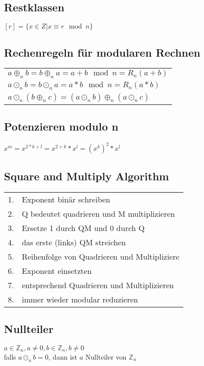 \subsection{Restklassen}
$ [r] = \{x \in Z | x \equiv r \mod n\} $

\subsection{Rechenregeln für modularen Rechnen}
\begin{tabular}{l}
    $a \oplus_n b = b \oplus_n a = a + b \mod n = R_n(a + b) $ \\
    $a \odot_n b = b \odot_n a = a * b \mod n = R_n(a * b)$ \\
    $a \odot_n (b \oplus_n c) = (a \odot_n b) \oplus_n (a \odot_n c)$ \\
\end{tabular} \newline

\subsection{Potenzieren modulo n}
$ x^m = x^{2 * k + l} = x^{2 + k} * x^l = (x^k)^2 * x^l $

\subsection{Square and Multiply Algorithm}
\begin{tabular}{rl}
    1. & Exponent binär schreiben \\
    2. & Q bedeutet quadrieren und M multiplizieren \\
    3. & Ersetze 1 durch QM und 0 durch Q \\
    4. & das erste (links) QM streichen \\
    5. & Reihenfolge von Quadrieren und Multipliziere \\
    6. & Exponent einsetzten \\
    7. & entsprechend Quadrieren und Multiplizieren \\
    8. & immer wieder modular reduzieren \\
\end{tabular}

\subsection{Nullteiler}
$ a \in \mathbb{Z}_n, a \neq 0, b \in \mathbb{Z}_n, b \neq 0 $ \\
falls $ a \odot_n b = 0 $, dann ist $a$ Nullteiler von $\mathbb{Z}_n$

